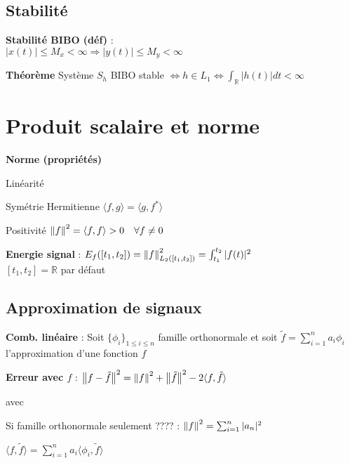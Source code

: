 \subsection*{Stabilité}

\textbf{Stabilité BIBO (déf)} : \\
$|x(t)| \leq M_x < \infty \Rightarrow |y(t)| \leq M_y < \infty$

\textbf{Théorème} Système $S_h$ BIBO stable $\Leftrightarrow h\in L_1 \Leftrightarrow \int_\mathbb{R} |h(t)| dt < \infty$ 



\section{Produit scalaire et norme}

\textbf{Norme (propriétés)}
\begin{enum}
    \item Linéarité
    \item Symétrie Hermitienne $\langle f, g \rangle = \langle g, f^* \rangle$
    \item Positivité $\left\lVert f\right\rVert^2 = \langle f, f \rangle > 0 \quad \forall f \neq 0$
\end{enum}

\textbf{Energie signal} : $E_f([t_1,t_2]) = \left\lVert f\right\rVert_{L_2([t_1,t_2])}^2 = \int_{t_1}^{t_2} |f(t)|^2$ \\
$[t_1,t_2] = \mathbb{R}$ par défaut


\subsection*{Approximation de signaux}

\textbf{Comb. linéaire} : Soit $\{\phi_i\}_{1\leq i \leq n}$ famille orthonormale et soit $\tilde f = \sum_{i=1}^n a_i\phi_i$ l'approximation d'une fonction $f$

\textbf{Erreur avec $f$} : $\left\lVert f-\tilde f\right\rVert^2 = \left\lVert f\right\rVert^2 + \left\lVert\tilde f\right\rVert^2 - 2 \langle f,\tilde f \rangle$

avec 
\begin{myitemize}
    \item Si famille orthonormale seulement  ???? : $\left\lVert f\right\rVert^2 = \sum_{i=1}^n |a_n|^2$ 
    \item $\langle f,\tilde f \rangle = \sum_{i=1}^n a_i \langle \phi_i, \tilde f \rangle$
\end{myitemize}


